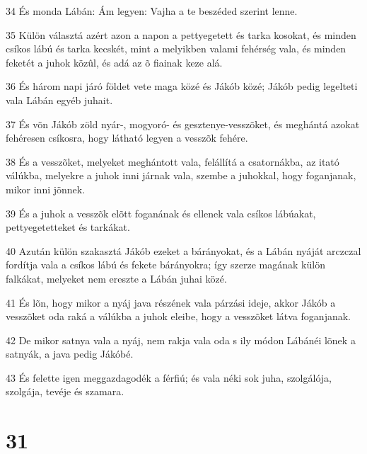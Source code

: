 \par 34 És monda Lábán: Ám legyen: Vajha a te beszéded szerint lenne.
\par 35 Külön választá azért azon a napon a pettyegetett és tarka kosokat, és minden csíkos lábú és tarka kecskét, mint a melyikben valami fehérség vala, és minden feketét a juhok közûl, és adá az õ fiainak keze alá.
\par 36 És három napi járó földet vete maga közé és Jákób közé; Jákób pedig legelteti vala Lábán egyéb juhait.
\par 37 És võn Jákób zöld nyár-, mogyoró- és gesztenye-vesszõket, és meghántá azokat fehéresen csíkosra, hogy látható legyen a vesszõk fehére.
\par 38 És a vesszõket, melyeket meghántott vala, felállítá a csatornákba, az itató válúkba, melyekre a juhok inni járnak vala, szembe a juhokkal, hogy foganjanak, mikor inni jönnek.
\par 39 És a juhok a vesszõk elõtt foganának és ellenek vala csíkos lábúakat, pettyegetetteket és tarkákat.
\par 40 Azután külön szakasztá Jákób ezeket a bárányokat, és a Lábán nyáját arczczal fordítja vala a csíkos lábú és fekete bárányokra; így szerze magának külön falkákat, melyeket nem ereszte a Lábán juhai közé.
\par 41 És lõn, hogy mikor a nyáj java részének vala párzási ideje, akkor Jákób a vesszõket oda raká a válúkba a juhok eleibe, hogy a vesszõket látva foganjanak.
\par 42 De mikor satnya vala a nyáj, nem rakja vala oda s ily módon Lábánéi lõnek a satnyák, a java pedig Jákóbé.
\par 43 És felette igen meggazdagodék a férfiú; és vala néki sok juha, szolgálója, szolgája, tevéje és szamara.

\chapter{31}

